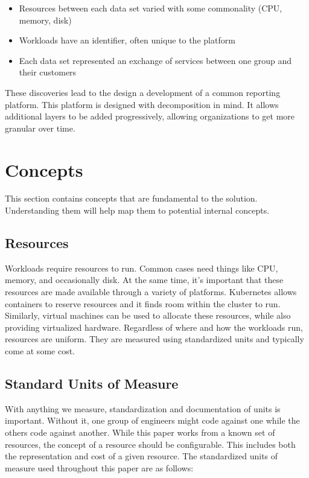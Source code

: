 \documentclass[10pt, a4paper, twocolumn]{article}
\begin{document}
  \begin{itemize}
    \item Resources between each data set varied with some commonality (CPU, memory, disk)
    \item Workloads have an identifier, often unique to the platform
    \item Each data set represented an exchange of services between one group and their customers
  \end{itemize}

  These discoveries lead to the design a development of a common reporting platform.
  This platform is designed with decomposition in mind.
  It allows additional layers to be added progressively, allowing organizations to get more granular over time.

\section*{Concepts}
  This section contains concepts that are fundamental to the solution.
  Understanding them will help map them to potential internal concepts.

  \subsection*{Resources}
    Workloads require resources to run.
    Common cases need things like CPU, memory, and occasionally disk.
    At the same time, it's important that these resources are made available through a variety of platforms.
    Kubernetes allows containers to reserve resources and it finds room within the cluster to run.
    Similarly, virtual machines can be used to allocate these resources, while also providing virtualized hardware.
    Regardless of where and how the workloads run, resources are uniform.
    They are measured using standardized units and typically come at some cost.

  \subsection*{Standard Units of Measure}
    With anything we measure, standardization and documentation of units is important.
    Without it, one group of engineers might code against one while the others code against another.
    While this paper works from a known set of resources, the concept of a resource should be configurable.
    This includes both the representation and cost of a given resource.
    The standardized units of measure used throughout this paper are as follows:
\end{document}
